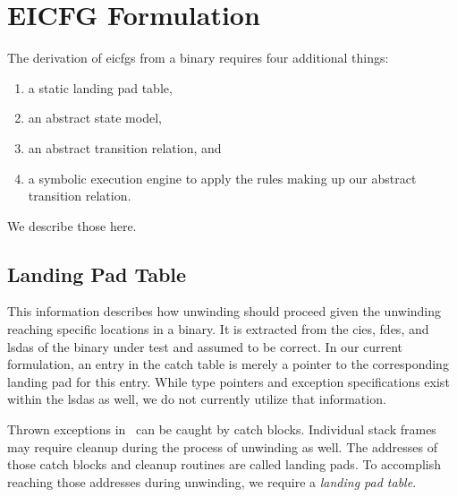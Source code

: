 \chapter{EICFG Formulation}\label{ch:eicfg-formulation}

The derivation of \acp{eicfg} from a binary requires four additional things:
\begin{enumerate}
    \item a static landing pad table,
    \item an abstract state model,
    \item an abstract transition relation, and
    \item a symbolic execution engine to apply the rules making up our abstract transition relation.
\end{enumerate}
We describe those here.

\section{Landing Pad Table}\label{sec:landing-pad-table}
This information describes how unwinding should proceed given the unwinding reaching specific locations in a binary.
It is extracted from the \acp{cie}, \acp{fde}, and \acp{lsda} of the binary under test and assumed to be correct.
In our current formulation, an entry in the catch table is merely a pointer to the corresponding landing pad for this entry.
While type pointers and exception specifications exist within the \acp{lsda} as well, we do not currently utilize that information.

Thrown exceptions in \Cpp\ can be caught by catch blocks.
Individual stack frames may require cleanup during the process of unwinding as well.
The addresses of those catch blocks and cleanup routines are called landing pads.
To accomplish reaching those addresses during unwinding, we require a \emph{landing pad table}.

